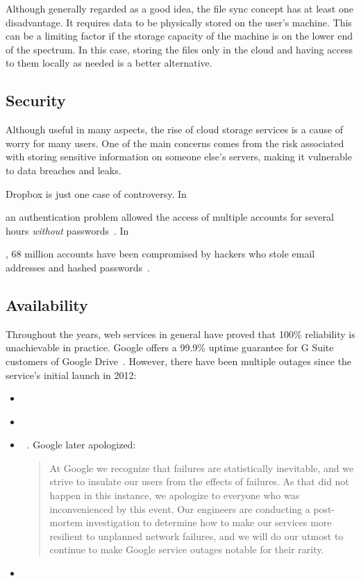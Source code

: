 Although generally regarded as a good idea, the file sync concept has at least one disadvantage. It requires data to be physically stored on the user's machine. This can be a limiting factor if the storage capacity of the machine is on the lower end of the spectrum. In this case, storing the files only in the cloud and having access to them locally as needed is a better alternative.

\subsection{Security}

Although useful in many aspects, the rise of cloud storage services is a cause of worry for many users. One of the main concerns comes from the risk associated with storing sensitive information on someone else's servers, making it vulnerable to data breaches and leaks.

Dropbox is just one case of controversy. In \date{June 2011} an authentication problem allowed the access of multiple accounts for several hours \emph{without} passwords~\cite{dropbox_security_bug_made_passwords_optional_for_four_hours}. In \date{August 2016}, 68 million accounts have been compromised by hackers who stole email addresses and hashed passwords~\cite{dropbox_hackers_stole_email_addresses}.

\subsection{Availability}

Throughout the years, web services in general have proved that 100\% reliability is unachievable in practice. Google offers a 99.9\% uptime guarantee for G Suite customers of Google Drive~\cite{google_drive_reliability}. However, there have been multiple outages since the service's initial launch in 2012:

\begin{itemize}
  \itemsep0em
  \item \date{March 2013}~\cite{google_drive_experiencing_outage}
  \item \date{October 2014}~\cite{google_drive_and_docs_down}
  \item \date{January 2016}~\cite{gmail_google_drive_down}. Google later apologized:
    \begin{quote}
      At Google we recognize that failures are statistically inevitable, and we strive to insulate our users from the effects of failures. As that did not happen in this instance, we apologize to everyone who was inconvenienced by this event. Our engineers are conducting a post-mortem investigation to determine how to make our services more resilient to unplanned network failures, and we will do our utmost to continue to make Google service outages notable for their rarity.~\cite{google_outage_apology}
    \end{quote}
  \item \date{September 2017}~\cite{google_suffered_a_meltdown}
\end{itemize}

